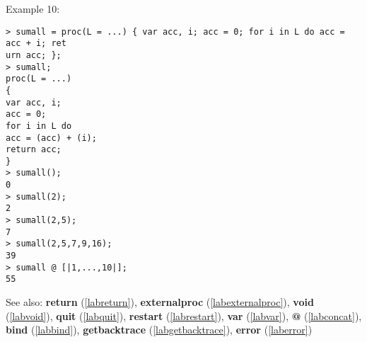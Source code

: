 \noindent Example 10: 
\begin{center}\begin{minipage}{15cm}\begin{Verbatim}[frame=single,commandchars=\\\|\~]
> sumall = proc(L = ...) { var acc, i; acc = 0; for i in L do acc = acc + i; ret
urn acc; };
> sumall;
proc(L = ...)
{
var acc, i;
acc = 0;
for i in L do
acc = (acc) + (i);
return acc;
}
> sumall();
0
> sumall(2);
2
> sumall(2,5);
7
> sumall(2,5,7,9,16);
39
> sumall @ [|1,...,10|];
55
\end{Verbatim}
\end{minipage}\end{center}
See also: \textbf{return} (\ref{labreturn}), \textbf{externalproc} (\ref{labexternalproc}), \textbf{void} (\ref{labvoid}), \textbf{quit} (\ref{labquit}), \textbf{restart} (\ref{labrestart}), \textbf{var} (\ref{labvar}), \textbf{@} (\ref{labconcat}), \textbf{bind} (\ref{labbind}), \textbf{getbacktrace} (\ref{labgetbacktrace}), \textbf{error} (\ref{laberror})
